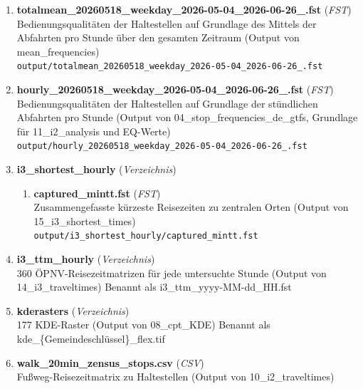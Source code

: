 \begin{enumerate}[label=\arabic*, leftmargin=*, itemsep=0.5em, topsep=0.3em]
\begin{enumerate}[label=\arabic{enumi}.\arabic*, leftmargin=*, itemsep=0.5em, topsep=0.3em]
Bedienungsqualitäten der Haltestellen auf Grundlage des stündlichen Mittels der Abfahrten pro Stunde (Output von mean\_frequencies)\\
\texttt{\small output/hourmean\_20260518\_weekday\_2026-05-04\_2026-06-26\_.fst}
\item \textbf{totalmean\_20260518\_weekday\_2026-05-04\_2026-06-26\_.fst} \textnormal{(\textit{FST})}\\
Bedienungsqualitäten der Haltestellen auf Grundlage des Mittels der Abfahrten pro Stunde über den gesamten Zeitraum (Output von mean\_frequencies)\\
\texttt{\small output/totalmean\_20260518\_weekday\_2026-05-04\_2026-06-26\_.fst}
\item \textbf{hourly\_20260518\_weekday\_2026-05-04\_2026-06-26\_.fst} \textnormal{(\textit{FST})}\\
Bedienungsqualitäten der Haltestellen auf Grundlage der stündlichen Abfahrten pro Stunde (Output von 04\_stop\_frequencies\_de\_gtfs, Grundlage für 11\_i2\_analysis und EQ-Werte)\\
\texttt{\small output/hourly\_20260518\_weekday\_2026-05-04\_2026-06-26\_.fst}
\item \textbf{i3\_shortest\_hourly} \textnormal{(\textit{Verzeichnis})}
\begin{enumerate}[label=\arabic{enumi}.\arabic{enumii}.\arabic*, leftmargin=*, itemsep=0.5em, topsep=0.3em]
\item \textbf{captured\_mintt.fst} \textnormal{(\textit{FST})}\\
Zusammengefasste kürzeste Reisezeiten zu zentralen Orten (Output von 15\_i3\_shortest\_times)\\
\texttt{\small output/i3\_shortest\_hourly/captured\_mintt.fst}
\end{enumerate}
\item \textbf{i3\_ttm\_hourly} \textnormal{(\textit{Verzeichnis})}\\
360 ÖPNV-Reisezeitmatrizen für jede untersuchte Stunde (Output von 14\_i3\_traveltimes)
Benannt als i3\_ttm\_yyyy-MM-dd\_HH.fst
\item \textbf{kderasters} \textnormal{(\textit{Verzeichnis})}\\
177 KDE-Raster (Output von 08\_cpt\_KDE)
Benannt als kde\_\{Gemeindeschlüssel\}\_flex.tif
\item \textbf{walk\_20min\_zensus\_stops.csv} \textnormal{(\textit{CSV})}\\
Fußweg-Reisezeitmatrix zu Haltestellen (Output von 10\_i2\_traveltimes)\\

\end{enumerate}
\end{enumerate}
